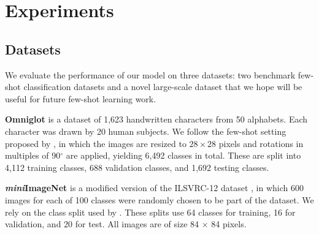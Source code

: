 \section{Experiments}

\subsection{Datasets}

We evaluate the performance of our model on three datasets: two benchmark few-shot classification
datasets and a novel large-scale dataset that we hope will be useful for future few-shot learning
work.

\textbf{Omniglot} \citep{lake2011oneshot} is a dataset of 1,623 handwritten characters from 50
alphabets. Each character was drawn by 20 human subjects. We follow the few-shot setting proposed by
\citet{vinyals2016matchingnet}, in which the images are resized to $28 \times 28$ pixels and
rotations in multiples of 90$^\circ$ are applied, yielding 6,492 classes in total. These are split
into 4,112 training classes, 688 validation classes, and 1,692 testing classes.

\textbf{\textit{mini}ImageNet} \citep{vinyals2016matchingnet} is a modified version of the ILSVRC-12
dataset \citep{russakovsky2015imagenet}, in which 600 images for each of 100 classes were randomly
chosen to be part of the dataset. We rely on the class split used by \citet{ravi2017oneshot}. These
splits use 64 classes for training, 16 for validation, and 20 for test. All images are of size 84
$\times$ 84 pixels.

